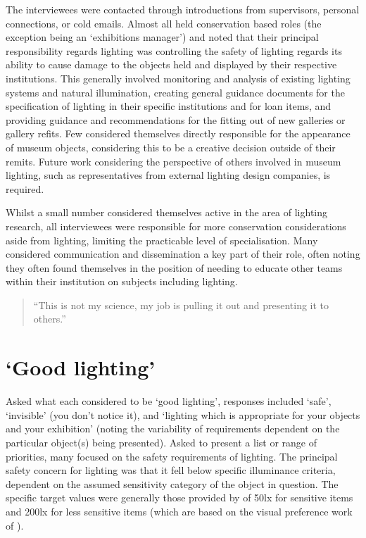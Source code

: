 The interviewees were contacted through introductions from supervisors, personal connections, or cold emails. Almost all held conservation based roles (the exception being an `exhibitions manager') and noted that their principal responsibility regards lighting was controlling the safety of lighting regards its ability to cause damage to the objects held and displayed by their respective institutions. This generally involved monitoring and analysis of existing lighting systems and natural illumination, creating general guidance documents for the specification of lighting in their specific institutions and for loan items, and providing guidance and recommendations for the fitting out of new galleries or gallery refits. Few considered themselves directly responsible for the appearance of museum objects, considering this to be a creative decision outside of their remits. Future work considering the perspective of others involved in museum lighting, such as representatives from external lighting design companies, is required.

Whilst a small number considered themselves active in the area of lighting research, all interviewees were responsible for more conservation considerations aside from lighting, limiting the practicable level of specialisation. Many considered communication and dissemination a key part of their role, often noting they often found themselves in the position of needing to educate other teams within their institution on subjects including lighting. 

\begin{quote}
``This is not my science, my job is pulling it out and presenting it to others.''
\end{quote}

\section{`Good lighting'}
Asked what each considered to be `good lighting', responses included `safe', `invisible' (you don't notice it), and `lighting which is appropriate for your objects and your exhibition' (noting the variability of requirements dependent on the particular object(s) being presented). Asked to present a list or range of priorities, many focused on the safety requirements of lighting. The principal safety concern for lighting was that it fell below specific illuminance criteria, dependent on the assumed sensitivity category of the object in question. The specific target values were generally those provided by \citet{thomson_museum_1986} of 50lx for sensitive items and 200lx for less sensitive items (which are based on the visual preference work of \citet{loe_preferred_1982}).

